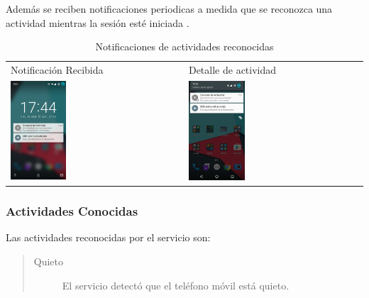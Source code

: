 {Además se reciben notificaciones periodicas a medida que se reconozca una actividad mientras la sesión esté iniciada .

\begin{table}[!h]
\begin{tabular}{ll}
\textsf{\relax 
Notificación Recibida
} & \textsf{\relax 
Detalle de actividad
}\\
    {\includegraphics[width=0.33\textwidth]{anexos/graphics/scr_notification.jpg}}
 & 
    {\includegraphics[width=0.33\textwidth]{anexos/graphics/bar_notification2.jpg}}
\\
\end{tabular}
    \caption{Notificaciones de actividades reconocidas}\label{contrib:actnot}
\end{table}

\pagebreak

\subsubsection{Actividades Conocidas}
\label{contrib:actividades-conocidas}
Las actividades reconocidas por el servicio son:
\begin{quote}
\begin{description}
\item[{Quieto}] \leavevmode
El servicio detectó que el teléfono móvil está quieto.


\end{description}
\end{quote}}
